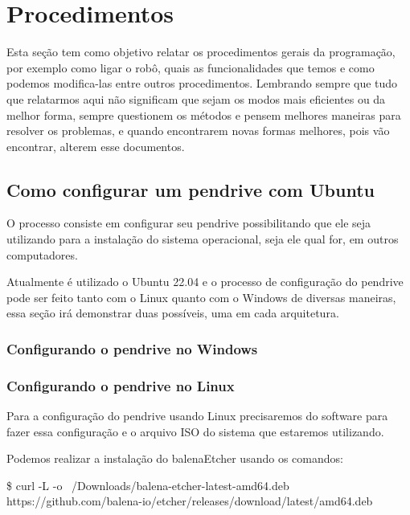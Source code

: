\section{Procedimentos}
	Esta seção tem como objetivo relatar os procedimentos gerais da programação, por exemplo como ligar o robô, quais as funcionalidades que temos e como podemos modifica-las entre outros procedimentos. Lembrando sempre que tudo que relatarmos aqui não significam que sejam os modos mais eficientes ou da melhor forma, sempre questionem os métodos e pensem melhores maneiras para resolver os problemas, e quando encontrarem novas formas melhores, pois vão encontrar, alterem esse documentos.
	
	\subsection{Como configurar um pendrive com Ubuntu}
		O processo consiste em configurar seu pendrive possibilitando que ele seja utilizando para a instalação do sistema operacional, seja ele qual for, em outros computadores.
		
		Atualmente é utilizado o Ubuntu 22.04 e o processo de configuração do pendrive pode ser feito tanto com o Linux quanto com o Windows de diversas maneiras, essa seção irá demonstrar duas possíveis, uma em cada arquitetura.
		
		\subsubsection{Configurando o pendrive no Windows}
		
		\subsubsection{Configurando o pendrive no Linux}
			Para a configuração do pendrive usando Linux precisaremos do software para fazer essa configuração e o arquivo ISO do sistema que estaremos utilizando.
			
			
			Podemos realizar a instalação do balenaEtcher usando os comandos:
			
			 \noindent \$ curl -L -o ~/Downloads/balena-etcher-latest-amd64.deb https://github.com/balena-io/etcher/releases/download/latest/\*amd64.deb
			 
